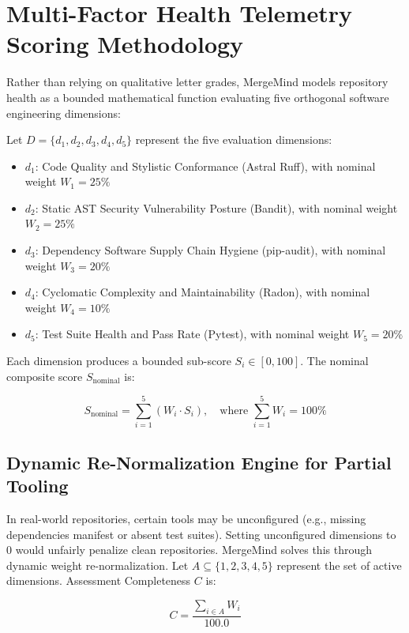 \documentclass[12pt,a4paper,oneside]{report}
\begin{document}
\section{Multi-Factor Health Telemetry Scoring Methodology}
\label{sec:health-methodology}

Rather than relying on qualitative letter grades, MergeMind models repository health as a bounded mathematical function evaluating five orthogonal software engineering dimensions:

Let $D = \{d_1, d_2, d_3, d_4, d_5\}$ represent the five evaluation dimensions:
\begin{itemize}
    \item $d_1$: Code Quality and Stylistic Conformance (Astral Ruff), with nominal weight $W_1 = 25\%$
    \item $d_2$: Static AST Security Vulnerability Posture (Bandit), with nominal weight $W_2 = 25\%$
    \item $d_3$: Dependency Software Supply Chain Hygiene (pip-audit), with nominal weight $W_3 = 20\%$
    \item $d_4$: Cyclomatic Complexity and Maintainability (Radon), with nominal weight $W_4 = 10\%$
    \item $d_5$: Test Suite Health and Pass Rate (Pytest), with nominal weight $W_5 = 20\%$
\end{itemize}

Each dimension produces a bounded sub-score $S_i \in [0, 100]$. The nominal composite score $S_{\text{nominal}}$ is:

\begin{equation}
S_{\text{nominal}} = \sum_{i=1}^{5} (W_i \cdot S_i), \quad \text{where } \sum_{i=1}^{5} W_i = 100\%
\label{eq:nominal-health-score}
\end{equation}

\subsection{Dynamic Re-Normalization Engine for Partial Tooling}
In real-world repositories, certain tools may be unconfigured (e.g., missing dependencies manifest or absent test suites). Setting unconfigured dimensions to 0 would unfairly penalize clean repositories. MergeMind solves this through dynamic weight re-normalization. Let $A \subseteq \{1, 2, 3, 4, 5\}$ represent the set of active dimensions. Assessment Completeness $C$ is:

\begin{equation}
C = \frac{\sum_{i \in A} W_i}{100.0}
\label{eq:completeness}
\end{equation}
\end{document}
